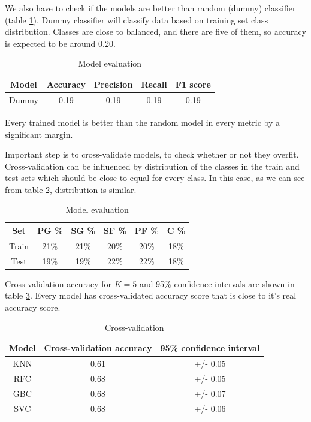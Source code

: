 \documentclass[a4paper]{article}
\begin{document}
We also have to check if the models are better than random (dummy) classifier (table \ref{tab:pos_clf_dummy}). Dummy classifier will classify data based on training set class distribution. Classes are close to balanced, and there are five of them, so accuracy is expected to be around 0.20.

\begin{table}[!h]
\begin{center}
\begin{tabular}{|c|c|c|c|c|} \hline
Model & Accuracy & Precision & Recall & F1 score \\ \hline
Dummy & 0.19 & 0.19 & 0.19 & 0.19 \\ \hline
\end{tabular}
\caption{Model evaluation}
\label{tab:pos_clf_dummy}
\end{center}
\end{table}

Every trained model is better than the random model in every metric by a significant margin.

Important step is to cross-validate models, to check whether or not they overfit. Cross-validation can be influenced by distribution of the classes in the train and test sets which should be close to equal for every class. In this case, as we can see from table \ref{tab:pos_clf_cross_val}, distribution is similar.

\begin{table}[!h]
\begin{center}
\begin{tabular}{|c|c|c|c|c|c|} \hline
Set & PG \% & SG \% & SF \% & PF \% & C \% \\ \hline
Train & 21\% & 21\% & 20\% & 20\%  & 18\% \\ \hline
Test & 19\% & 19\% & 22\% & 22\% & 18\% \\ \hline
\end{tabular}
\caption{Model evaluation}
\label{tab:pos_clf_cross_val}
\end{center}
\end{table}

Cross-validation accuracy for $K = 5$ and 95\% confidence intervals are shown in table \ref{tab:pos_clf_cross_val_eval}. Every model has cross-validated accuracy score that is close to it's real accuracy score.

\begin{table}[!h]
\begin{center}
\begin{tabular}{|c|c|c|} \hline
Model & Cross-validation accuracy & 95\% confidence interval \\ \hline
KNN & 0.61 & +/- 0.05 \\ \hline
RFC & 0.68 & +/- 0.05 \\ \hline
GBC & 0.68 & +/- 0.07 \\ \hline
SVC & 0.68 & +/- 0.06 \\ \hline
\end{tabular}
\caption{Cross-validation}
\label{tab:pos_clf_cross_val_eval}
\end{center}
\end{table}
\end{document}
